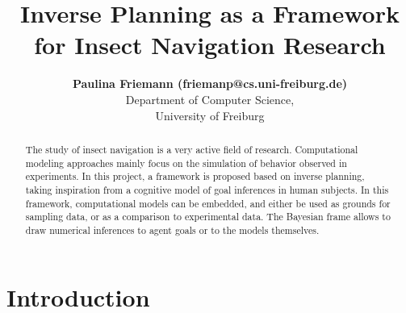 \documentclass[10pt,letterpaper]{article}
\title{Inverse Planning as a Framework for Insect Navigation Research}
\author{{\large \bf Paulina Friemann (friemanp@cs.uni-freiburg.de)} \\
  Department of Computer Science, \\
  University of Freiburg}
\begin{document}
\maketitle

\iffalse
\todo{i get now where this should be going: overall question of which pathfinding algos are there, how biologically plausible are they? two paths: 1) theoretical work of things like time and memory complexity, representational structures, performance (?), (dis-)advantages, assumptions and constraints, etc. 2) experimental sampling in a framework: explanation of the framework, what is there etc., then frame it as okay we want to take a look at not only this value iteration policy generation, but at all kinds of pathfinding algos, adapted to solve the same problem, i.e., to generate policies over the environment. here we can build the bridge towards trajectory sampling stuff.}
\fi

\begin{abstract}
The study of insect navigation is a very active field of research.
Computational modeling approaches mainly focus on the simulation of behavior observed in experiments.
In this project, a framework is proposed based on inverse planning, taking inspiration from a cognitive model of goal inferences in human subjects.
In this framework, computational models can be embedded, and either be used as grounds for sampling data, or as a comparison to experimental data.
The Bayesian frame allows to draw numerical inferences to agent goals or to the models themselves.
\end{abstract}

\iffalse
\begin{itemize}
	\item Introduction
	\item Tenenbaum Paper
	\item Problem Definition....from Pathfinding to Policy Finding
	\item Pathfinding Algos
	\item Program Workings, pseudocode and formulas
	\item Trajectory Sampling
\end{itemize}
\fi


%

\section{Introduction}

\end{document}
